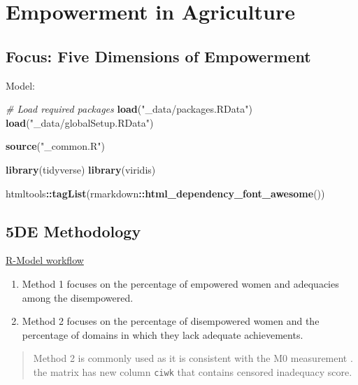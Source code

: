 \documentclass[
]{book}
\newenvironment{Shaded}{\begin{snugshade}}{\end{snugshade}}
\newcommand{\CommentTok}[1]{\textcolor[rgb]{0.56,0.35,0.01}{\textit{#1}}}
\newcommand{\KeywordTok}[1]{\textcolor[rgb]{0.13,0.29,0.53}{\textbf{#1}}}
\newcommand{\NormalTok}[1]{#1}
\newcommand{\OperatorTok}[1]{\textcolor[rgb]{0.81,0.36,0.00}{\textbf{#1}}}
\newcommand{\StringTok}[1]{\textcolor[rgb]{0.31,0.60,0.02}{#1}}
\providecommand{\tightlist}{%
  \setlength{\itemsep}{0pt}\setlength{\parskip}{0pt}}
\begin{document}
\hypertarget{empowerment-in-agriculture}{%
\chapter{Empowerment in Agriculture}\label{empowerment-in-agriculture}}

\hypertarget{focus-five-dimensions-of-empowerment}{%
\section{Focus: Five Dimensions of Empowerment}\label{focus-five-dimensions-of-empowerment}}

Model: \citep{Alkire2011}

\begin{Shaded}
\begin{Highlighting}[]
\CommentTok{\# Load required packages}
\KeywordTok{load}\NormalTok{(}\StringTok{"\_data/packages.RData"}\NormalTok{)}
\KeywordTok{load}\NormalTok{(}\StringTok{"\_data/globalSetup.RData"}\NormalTok{)}

\KeywordTok{source}\NormalTok{(}\StringTok{"\_common.R"}\NormalTok{)}

\KeywordTok{library}\NormalTok{(tidyverse)}
\KeywordTok{library}\NormalTok{(viridis)}

\NormalTok{htmltools}\OperatorTok{::}\KeywordTok{tagList}\NormalTok{(rmarkdown}\OperatorTok{::}\KeywordTok{html\_dependency\_font\_awesome}\NormalTok{())}
\end{Highlighting}
\end{Shaded}

\hypertarget{de-methodology}{%
\section{5DE Methodology}\label{de-methodology}}

\href{https://tmbuza.github.io/indexes/}{R-Model workflow}

\begin{enumerate}
\def\labelenumi{\arabic{enumi}.}
\tightlist
\item
  Method 1 focuses on the percentage of empowered women and adequacies among the disempowered.
\item
  Method 2 focuses on the percentage of disempowered women and the percentage of domains in which they lack adequate achievements.
\end{enumerate}

\begin{quote}
Method 2 is commonly used as it is consistent with the M0 measurement \citep{Alkire2011}.
the matrix has new column \texttt{ciwk} that contains censored inadequacy score.
\end{quote}
\end{document}
